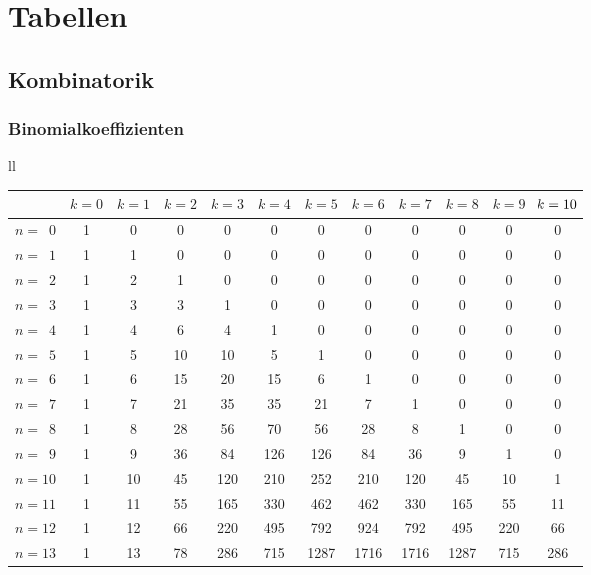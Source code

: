 
\onecolumn
\chapter{Tabellen}
\section{Kombinatorik}
\subsection{Binomialkoeffizienten}

\hspace{-6pt}\begin{tabular}{ll}
\begin{tabular}[t]{|l|c|c|c|c|c|c|c|c|c|c|c|}
\hline\pstrut{2pt}
& $k=0$ & $k=1$ & $k=2$ & $k=3$ & $k=4$ & $k=5$ & $k=6$ & $k=7$ & $k=8$ & $k=9$ & $\hspace{-2pt}k=10\hspace{-2pt}$\\
\hline\pstrut{1pt}%
$n=\phantom{1}0$ & 1 & 0 & 0 & 0 & 0 & 0 & 0 & 0 & 0 & 0 & 0\\
$n=\phantom{1}1$ & 1 & 1 & 0 & 0 & 0 & 0 & 0 & 0 & 0 & 0 & 0\\
$n=\phantom{1}2$ & 1 & 2 & 1 & 0 & 0 & 0 & 0 & 0 & 0 & 0 & 0\\
$n=\phantom{1}3$ & 1 & 3 & 3 & 1 & 0 & 0 & 0 & 0 & 0 & 0 & 0\\
\hline\pstrut{2pt}%
$n=\phantom{1}4$ & 1 & 4 & 6 & 4 & 1 & 0 & 0 & 0 & 0 & 0 & 0\\
$n=\phantom{1}5$ & 1 & 5 & 10 & 10 & 5 & 1 & 0 & 0 & 0 & 0 & 0\\
$n=\phantom{1}6$ & 1 & 6 & 15 & 20 & 15 & 6 & 1 & 0 & 0 & 0 & 0\\
$n=\phantom{1}7$ & 1 & 7 & 21 & 35 & 35 & 21 & 7 & 1 & 0 & 0 & 0\\
\hline\pstrut{2pt}%
$n=\phantom{1}8$ & 1 & 8 & 28 & 56 & 70 & 56 & 28 & 8 & 1 & 0 & 0\\
$n=\phantom{1}9$ & 1 & 9 & 36 & 84 & 126 & 126 & 84 & 36 & 9 & 1 & 0\\
$n=10$ & 1 & 10 & 45 & 120 & 210 & 252 & 210 & 120 & 45 & 10 & 1\\
$n=11$ & 1 & 11 & 55 & 165 & 330 & 462 & 462 & 330 & 165 & 55 & 11\\
\hline\pstrut{2pt}%
$n=12$ & 1 & 12 & 66 & 220 & 495 & 792 & 924 & 792 & 495 & 220 & 66\\
$n=13$ & 1 & 13 & 78 & 286 & 715 & 1287 & 1716 & 1716 & 1287 & 715 & 286\\

\end{tabular}
\end{tabular}
